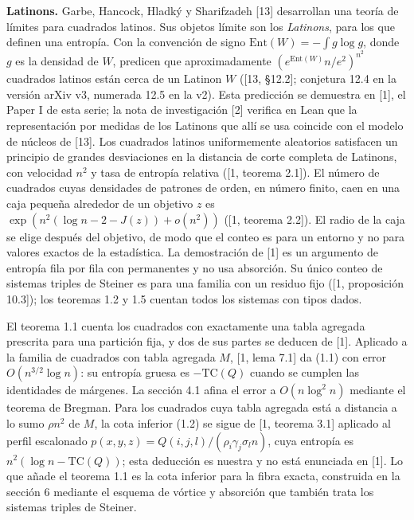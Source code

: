 \documentclass[spanish,11pt,a4paper]{article}
\begin{document}
\textbf{Latinons.} Garbe, Hancock, Hladký y Sharifzadeh {[}13{]} desarrollan una teoría de límites para cuadrados latinos. Sus objetos límite son los \emph{Latinons}, para los que definen una entropía. Con la convención de signo \(\mathrm{Ent}(W)=-\int g\log g\), donde \(g\) es la densidad de \(W\), predicen que aproximadamente \((e^{\mathrm{Ent}(W)}n/e^2)^{n^2}\) cuadrados latinos están cerca de un Latinon \(W\) ({[}13, §12.2{]}; conjetura 12.4 en la versión arXiv v3, numerada 12.5 en la v2). Esta predicción se demuestra en {[}1{]}, el Paper I de esta serie; la nota de investigación {[}2{]} verifica en Lean que la representación por medidas de los Latinons que allí se usa coincide con el modelo de núcleos de {[}13{]}. Los cuadrados latinos uniformemente aleatorios satisfacen un principio de grandes desviaciones en la distancia de corte completa de Latinons, con velocidad \(n^2\) y tasa de entropía relativa ({[}1, teorema 2.1{]}). El número de cuadrados cuyas densidades de patrones de orden, en número finito, caen en una caja pequeña alrededor de un objetivo \(z\) es \(\exp(n^2(\log n-2-J(z))+o(n^2))\) ({[}1, teorema 2.2{]}). El radio de la caja se elige después del objetivo, de modo que el conteo es para un entorno y no para valores exactos de la estadística. La demostración de {[}1{]} es un argumento de entropía fila por fila con permanentes y no usa absorción. Su único conteo de sistemas triples de Steiner es para una familia con un residuo fijo ({[}1, proposición 10.3{]}); los teoremas 1.2 y 1.5 cuentan todos los sistemas con tipos dados.

El teorema 1.1 cuenta los cuadrados con exactamente una tabla agregada prescrita para una partición fija, y dos de sus partes se deducen de {[}1{]}. Aplicado a la familia de cuadrados con tabla agregada \(M\), {[}1, lema 7.1{]} da (1.1) con error \(O(n^{3/2}\log n)\): su entropía gruesa es \(-\mathrm{TC}(Q)\) cuando se cumplen las identidades de márgenes. La sección 4.1 afina el error a \(O(n\log^2 n)\) mediante el teorema de Bregman. Para los cuadrados cuya tabla agregada está a distancia a lo sumo \(\rho n^2\) de \(M\), la cota inferior (1.2) se sigue de {[}1, teorema 3.1{]} aplicado al perfil escalonado \(p(x,y,z)=Q(i,j,l)/(\rho_i\gamma_j\sigma_l n)\), cuya entropía es \(n^2(\log n-\mathrm{TC}(Q))\); esta deducción es nuestra y no está enunciada en {[}1{]}. Lo que añade el teorema 1.1 es la cota inferior para la fibra exacta, construida en la sección 6 mediante el esquema de vórtice y absorción que también trata los sistemas triples de Steiner.
\end{document}
